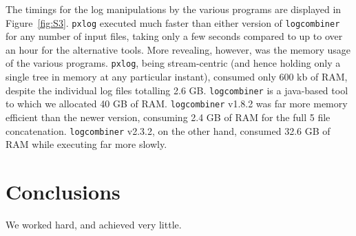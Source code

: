 \documentclass{article}
\begin{document}
The timings for the log manipulations by the various programs are
displayed in Figure~\ref{fig:S3}. \texttt{pxlog} executed much faster
than either version of \texttt{logcombiner} for any number of input
files, taking only a few seconds compared to up to over an hour for the
alternative tools. More revealing, however, was the memory usage of the
various programs. \texttt{pxlog}, being stream-centric (and hence holding
only a single tree in memory at any particular instant), consumed only 
600 kb of RAM, despite the individual log files totalling 2.6 GB.
\texttt{logcombiner} is a java-based tool to which we allocated 40 GB of
RAM. \texttt{logcombiner} v1.8.2 was far more memory efficient than the
newer version, consuming 2.4 GB of RAM for the full 5 file concatenation.
\texttt{logcombiner} v2.3.2, on the other hand, consumed 32.6 GB of
RAM while executing far more slowly.

\section{Conclusions}\label{conclusions}
We worked hard, and achieved very little.


%
%
%
%
%
%

\end{document}
